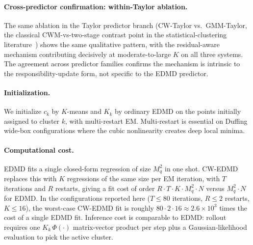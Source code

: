 \documentclass{article}
\begin{document}
\paragraph{Cross-predictor confirmation: within-Taylor ablation.} The same ablation in the Taylor predictor branch (CW-Taylor vs.\ GMM-Taylor, the classical CWM-vs-two-stage contrast point in the statistical-clustering literature~\citep{ingrassia2014linear}) shows the same qualitative pattern, with the residual-aware mechanism contributing decisively at moderate-to-large $K$ on all three systems. The agreement across predictor families confirms the mechanism is intrinsic to the responsibility-update form, not specific to the EDMD predictor.

\paragraph{Initialization.} We initialize $c_k$ by $K$-means and $K_k$ by ordinary EDMD on the points initially assigned to cluster $k$, with multi-restart EM. Multi-restart is essential on Duffing wide-box configurations where the cubic nonlinearity creates deep local minima.

\paragraph{Computational cost.} EDMD fits a single closed-form regression of size $M_q^2$ in one shot. CW-EDMD replaces this with $K$ regressions of the same size per EM iteration, with $T$ iterations and $R$ restarts, giving a fit cost of order $R \cdot T \cdot K \cdot M_q^2 \cdot N$ versus $M_q^2 \cdot N$ for EDMD. In the configurations reported here ($T \le 80$ iterations, $R \le 2$ restarts, $K \le 16$), the worst-case CW-EDMD fit is roughly $80 \cdot 2 \cdot 16 \approx 2.6\times10^3$ times the cost of a single EDMD fit. Inference cost is comparable to EDMD: rollout requires one $K_k\,\Phi(\cdot)$ matrix-vector product per step plus a Gaussian-likelihood evaluation to pick the active cluster.
\end{document}
